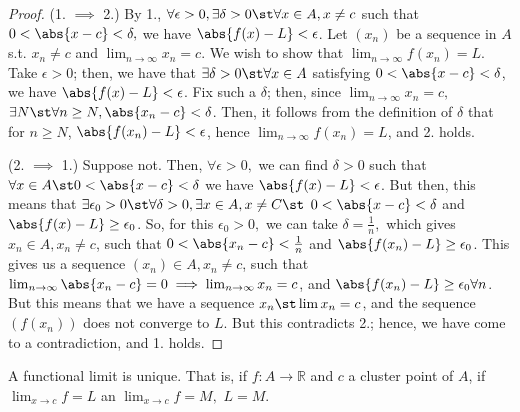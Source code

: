 \documentclass[12pt]{article}
\begin{document}
\begin{proof}
  (1. $\implies$ 2.) By 1., $\forall \epsilon > 0, \exists \delta > 0 \st \forall x \in A, x \neq c$ such that $0 < \abs{x - c} < \delta,$ we have $\abs{f(x) - L} < \epsilon$. Let $(x_n)$ be a sequence in $A$ s.t. $x_n \neq c$ and $\lim_{n\to\infty} x_n = c$. We wish to show that $\lim_{n\to\infty} f(x_n) = L$. Take $\epsilon > 0$; then, we have that $\exists \delta > 0 \st \forall x \in A$ satisfying $0 <\abs{x - c} < \delta$, we have $\abs{f(x) - L} < \epsilon$. Fix such a $\delta$; then, since $\lim_{n\to\infty} x_n = c,$ $\exists N \st \forall n \geq N, \abs{x_{n} - c} < \delta$. Then, it follows from the definition of $\delta$ that for $n \geq N$, $\abs{f(x_n) - L} < \epsilon$, hence $\lim_{n\to\infty} f(x_n) = L$, and 2. holds.

  (2. $\implies$ 1.) Suppose not. Then, $\forall \epsilon > 0,$ we can find $\delta > 0$ such that $\forall x \in A \st 0 < \abs{x - c} < \delta$ we have $\abs{f(x) - L} < \epsilon$. But then, this means that $\exists \epsilon_0 > 0 \st \forall \delta > 0, \exists x \in A, x \neq C \st$ $0 < \abs{x - c} < \delta$ and $\abs{f(x) - L} \geq \epsilon_0$. So, for this $\epsilon_0 >0,$ we can take $\delta = \frac{1}{n},$ which gives $x_n \in A, x_n \neq c$, such that $0 < \abs{x_n - c} < \frac{1}{n}$ and $\abs{f(x_n) - L} \geq \epsilon_0$. This gives us a sequence $(x_n) \in A, x_n \neq c$, such that $\lim_{n\to\infty} \abs{x_n - c} = 0 \implies \lim_{n\to\infty} x_n = c$,  and $\abs{f(x_n) - L} \geq \epsilon_0 \forall n$. But this means that we have a sequence $x_n \st \lim x_{n} = c$, and the sequence $(f(x_n))$ does not converge to $L$. But this contradicts 2.; hence, we have come to a contradiction, and 1. holds.
\end{proof}

\begin{proposition}
  A functional limit is unique. That is, if $f : A \to \mathbb{R}$ and $c$ a cluster point of $A$, if $\lim_{x\to c} f = L$ an $\lim_{x\to c} f = M,$ $L = M$.
\end{proposition}
\end{document}
